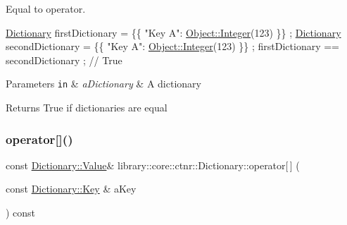Equal to operator. 


\begin{DoxyCode}
\hyperlink{classlibrary_1_1core_1_1ctnr_1_1_dictionary_a823a08112d9ee271f9fa5833f030ea1a}{Dictionary} firstDictionary = \{\{ \textcolor{stringliteral}{"Key A"}: \hyperlink{classlibrary_1_1core_1_1ctnr_1_1_object_a6746a69f0507b2c7ad8ebdf3d873b083}{Object::Integer}(123) \}\} ;
\hyperlink{classlibrary_1_1core_1_1ctnr_1_1_dictionary_a823a08112d9ee271f9fa5833f030ea1a}{Dictionary} secondDictionary = \{\{ \textcolor{stringliteral}{"Key A"}: \hyperlink{classlibrary_1_1core_1_1ctnr_1_1_object_a6746a69f0507b2c7ad8ebdf3d873b083}{Object::Integer}(123) \}\} ;
firstDictionary == secondDictionary ; \textcolor{comment}{// True}
\end{DoxyCode}



\begin{DoxyParams}[1]{Parameters}
\mbox{\tt in}  & {\em a\+Dictionary} & A dictionary \\
\hline
\end{DoxyParams}
\begin{DoxyReturn}{Returns}
True if dictionaries are equal 
\end{DoxyReturn}
\mbox{\label{classlibrary_1_1core_1_1ctnr_1_1_dictionary_ac5373f89362c83fee85e2d147d16eb40}} 
\subsubsection{\texorpdfstring{operator[]()}{operator[]()}\hspace{0.1cm}{\footnotesize\ttfamily [1/2]}}
{\footnotesize\ttfamily const \hyperlink{classlibrary_1_1core_1_1ctnr_1_1_dictionary_a3baf6692694e4fc27cb399ac083c88ea}{Dictionary\+::\+Value}\& library\+::core\+::ctnr\+::\+Dictionary\+::operator\mbox{[}$\,$\mbox{]} (\begin{DoxyParamCaption}\item[{const \hyperlink{classlibrary_1_1core_1_1ctnr_1_1_dictionary_a987cae687cce70d81a2a483c5e05e842}{Dictionary\+::\+Key} \&}]{a\+Key }\end{DoxyParamCaption}) const}



